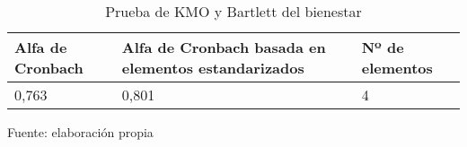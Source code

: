 \begin{table}[h]
    \caption {Prueba de KMO y Bartlett del bienestar}
	\label{tab:fiabilidadBienestar}
	\setlength\extrarowheight{5pt}
	
	\begin{tabular}{p{5.7cm} p{4.6cm} p{2.8cm}}
	\toprule
	Alfa de Cronbach	& Alfa de Cronbach basada en elementos estandarizados	& Nº de elementos \\
	\midrule
	0,763				& 0,801					& 4 \\
	\bottomrule
	\end{tabular}
	
	\center
	\footnotesize
	Fuente: elaboración propia
\end{table}
